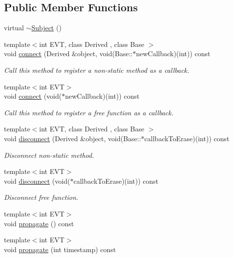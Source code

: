\subsection*{Public Member Functions}
\begin{DoxyCompactItemize}
\item 
virtual \hyperlink{classocra_1_1Subject_a4189b52b5d0a5b53d43e7a0f97a02fd7}{$\sim$\+Subject} ()
\item 
{\footnotesize template$<$int E\+VT, class Derived , class Base $>$ }\\void \hyperlink{classocra_1_1Subject_ab12f4d7cbe86db1cd707bd94ba86b682}{connect} (Derived \&object, void(Base\+::$\ast$new\+Callback)(int)) const
\begin{DoxyCompactList}\small\item\em Call this method to register a non-\/static method as a callback. \end{DoxyCompactList}\item 
{\footnotesize template$<$int E\+VT$>$ }\\void \hyperlink{classocra_1_1Subject_a457978501a99ac43d2a8a03224f00ac5}{connect} (void($\ast$new\+Callback)(int)) const
\begin{DoxyCompactList}\small\item\em Call this method to register a free function as a callback. \end{DoxyCompactList}\item 
{\footnotesize template$<$int E\+VT, class Derived , class Base $>$ }\\void \hyperlink{classocra_1_1Subject_a6c96a103a782be401def25981d70c407}{disconnect} (Derived \&object, void(Base\+::$\ast$callback\+To\+Erase)(int)) const
\begin{DoxyCompactList}\small\item\em Disconnect non-\/static method. \end{DoxyCompactList}\item 
{\footnotesize template$<$int E\+VT$>$ }\\void \hyperlink{classocra_1_1Subject_a0b00b12e5a125ff7e389887e5bcddfd3}{disconnect} (void($\ast$callback\+To\+Erase)(int)) const
\begin{DoxyCompactList}\small\item\em Disconnect free function. \end{DoxyCompactList}\item 
{\footnotesize template$<$int E\+VT$>$ }\\void \hyperlink{classocra_1_1Subject_ad8cfd92805c2c9444d09deda14b2dbc9}{propagate} () const
\item 
{\footnotesize template$<$int E\+VT$>$ }\\void \hyperlink{classocra_1_1Subject_aa5198dd8ca9dcb16105f6b53ffefbfca}{propagate} (int timestamp) const
\end{DoxyCompactItemize}
